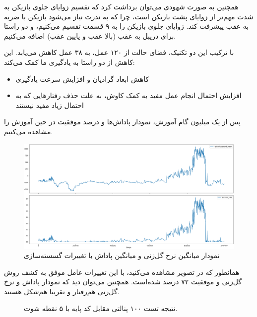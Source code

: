 همچنین به صورت شهودی می‌توان برداشت کرد که تقسیم زوایای جلوی بازیکن به شدت مهم‌تر از زوایای پشت بازیکن است، 
چرا که به ندرت نیاز می‌شود بازیکن با ضربه به عقب پیشرفت کند.
زوایای جلوی بازیکن را به ۹ قسمت تقسیم می‌کنیم، و دو راستا برای دریبل به عقب (بالا عقب و پایین عقب) اضافه می‌کنیم.

با ترکیب این دو تکنیک، فضای حالت از ۱۲۰ عمل، به ۳۸ عمل کاهش می‌یابد.
این کاهش از دو راستا به یادگیری ما کمک می‌کند:
\begin{itemize}
    \item کاهش ابعاد گرادیان و افزایش سرعت یادگیری
    \item افزایش احتمال انجام عمل مفید به کمک کاوش، به علت حذف رفتار‌هایی که به احتمال زیاد مفید نیستند
\end{itemize}
پس از یک میلیون گام آموزش، نمودار پاداش‌ها و درصد موفقیت در حین آموزش را مشاهده می‌کنیم.
\begin{figure}[H]
    \centering
    \includegraphics[width=1\textwidth]{images/dqn_discretization.png}
    \caption{نمودار میانگین نرخ گل‌زنی و میانگین پاداش  با تغییرات گسسته‌سازی}\label{fig:discretization_change}
\end{figure}
همانطور که در تصویر مشاهده می‌کنید، با این تغییرات عامل موفق به کشف روش گل‌زنی و موفقیت ۷۲ درصد شده‌است.
همچنین می‌توان دید که نمودار پاداش و نرخ گل‌زنی هم‌رفتار و تقریبا هم‌شکل هستند.
\begin{figure}[H]
    \centering
    \caption{نتیجه تست ۱۰۰ پنالتی مقابل کد پایه  با ۵ نقطه شوت.}\label{fig:discretization_pie}
\end{figure}


